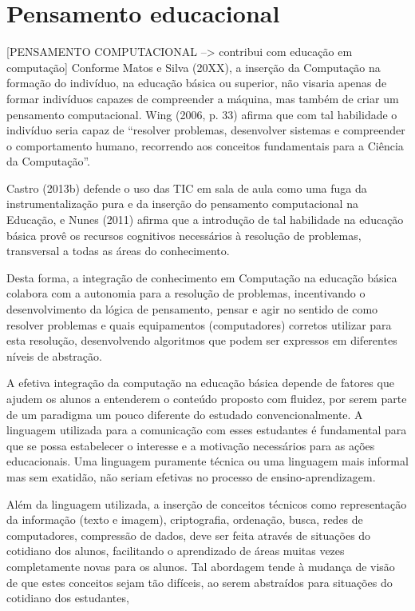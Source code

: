 \section{Pensamento educacional}%
 
[PENSAMENTO COMPUTACIONAL --> contribui com educação em computação]
	Conforme Matos e Silva (20XX), a inserção da Computação na formação do indivíduo, na educação básica ou superior, não visaria apenas de formar indivíduos capazes de compreender a máquina, mas também de criar um pensamento computacional. Wing (2006, p. 33) afirma que com tal habilidade o indivíduo seria capaz de “resolver problemas, desenvolver sistemas e compreender o comportamento humano, recorrendo aos conceitos fundamentais para a Ciência da Computação”.
    
    
	Castro (2013b) defende o uso das TIC em sala de aula como uma fuga da instrumentalização pura e da inserção do pensamento computacional na Educação, e Nunes (2011) afirma que a introdução de tal habilidade na educação básica provê os recursos cognitivos necessários à resolução de problemas, transversal a todas as áreas do conhecimento.
    
    
	 Desta forma, a integração de conhecimento em Computação na educação básica colabora com a autonomia para a resolução de problemas, incentivando o desenvolvimento da lógica de pensamento, pensar e agir no sentido de como resolver problemas e quais equipamentos (computadores) corretos utilizar para esta resolução, desenvolvendo algoritmos que podem ser expressos em diferentes níveis de abstração.
     
     
	A efetiva integração da computação na educação básica depende de fatores que ajudem os alunos a entenderem o conteúdo proposto com fluidez, por serem parte de um paradigma um pouco diferente do estudado convencionalmente. A linguagem utilizada para a comunicação com esses estudantes é fundamental para que se possa estabelecer o interesse e a motivação necessários para as ações educacionais. Uma linguagem puramente técnica ou uma linguagem mais informal mas sem exatidão, não seriam efetivas no processo de ensino-aprendizagem.
    
    
	Além da linguagem utilizada, a inserção de conceitos técnicos como representação da informação (texto e imagem), criptografia, ordenação, busca, redes de computadores, compressão de dados, deve ser feita através de situações do cotidiano dos alunos, facilitando o aprendizado de áreas muitas vezes completamente novas para os alunos. Tal abordagem tende à mudança de visão de que estes conceitos sejam tão difíceis, ao serem abstraídos para situações do cotidiano dos estudantes,
    
